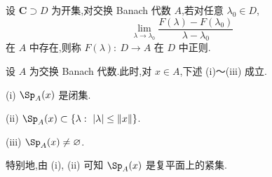 \begin{definition}\label{def:3.1.5}
设 $\mathbf{C} \supset D$ 为开集,对交换 Banach 代数 $A$,若对任意 $\lambda_{0} \in D$,
\begin{equation*}
\lim_{\lambda \to \lambda_{0}} \frac{F(\lambda) - F(\lambda_{0})}{\lambda - \lambda_{0}}
\end{equation*}
在 $A$ 中存在,则称 $F(\lambda):\ D \to A$ 在 $D$ 中正则.
\end{definition}

\begin{theorem}\label{thm:3.1.6}
设 $A$ 为交换 Banach 代数.此时,对 $x \in A$,下述 (i)～(iii) 成立.

(i) $\Sp_{A}(x)$ 是闭集.

(ii) $\Sp_{A}(x) \subset \{\lambda:\ |\lambda| \leq \|x\|\}$.

(iii) $\Sp_{A}(x) \neq \emptyset$.

特别地,由 (i), (ii) 可知 $\Sp_{A}(x)$ 是复平面上的紧集.
\end{theorem}


